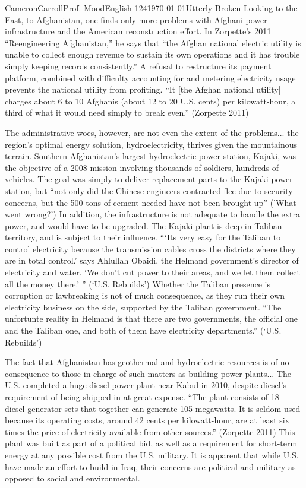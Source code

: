 \begin{mla}{Cameron}{Carroll}{Prof. Mood}{English 124}{\today}{Utterly Broken}
Looking to the East, to Afghanistan, one finds only more problems with Afghani power infrastructure and the American reconstruction effort. In Zorpette's 2011 ``Reengineering Afghanistan,'' he says that ``the Afghan national electric utility is unable to collect enough revenue to sustain its own operations and it has trouble simply keeping records consistently.'' A refusal to restructure its payment platform, combined with difficulty accounting for and metering electricity usage prevents the national utility from profiting. ``It [the Afghan national utility] charges about 6 to 10 Afghanis (about 12 to 20 U.S. cents) per kilowatt-hour, a third of what it would need simply to break even.'' (Zorpette 2011) 

The administrative woes, however, are not even the extent of the problems... the region's optimal energy solution, hydroelectricity, thrives given the mountainous terrain. Southern Afghanistan's largest hydroelectric power station, Kajaki, was the objective of a 2008 mission involving thousands of soldiers, hundreds of vehicles. The goal was simply to deliver replacement parts to the Kajaki power station, but ``not only did the Chinese engineers contracted flee due to security concerns, but the 500 tons of cement needed have not been brought up'' ('What went wrong?') In addition, the infrastructure is not adequate to handle the extra power, and would have to be upgraded. The Kajaki plant is deep in Taliban territory, and is subject to their influence. ```Its very easy for the Taliban to control electricity because the transmission cables cross the districts where they are in total control.' says Ahlullah Obaidi, the Helmand government's director of electricity and water. `We don't cut power to their areas, and we let them collect all the money there.' '' (`U.S. Rebuilds') Whether the Taliban presence is corruption or lawbreaking is not of much consequence, as they run their own electricity business on the side, supported by the Taliban government. ``The unfortunte reality in Helmand is that there are two governments, the official one and the Taliban one, and both of them have electricity departments.'' (`U.S. Rebuilds')

The fact that Afghanistan has geothermal and hydroelectric resources is of no consequence to those in charge of such matters as building power plants... The U.S. completed a huge diesel power plant near Kabul in 2010, despite diesel's requirement of being shipped in at great expense. ``The plant consists of 18 diesel-generator sets that together can generate 105 megawatts. It is seldom used because its operating costs, around 42 cents per kilowatt-hour, are at least six times the price of electricity available from other sources.'' (Zorpette 2011) This plant was built as part of a political bid, as well as a requirement for short-term energy at any possible cost from the U.S. military. It is apparent that while U.S. have made an effort to build in Iraq, their concerns are political and military as opposed to social and environmental. 


\end{mla}

